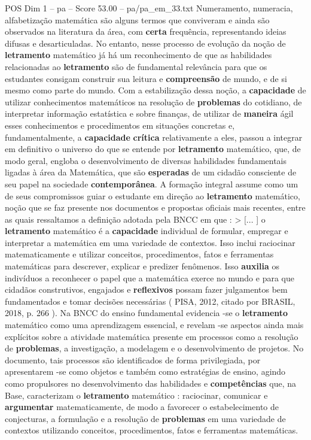 \begin{textsample}{POS Dim 1 – pa – Score 53.00 – pa/pa\_em\_33.txt}
Numeramento, numeracia, alfabetização matemática são alguns termos que conviveram e ainda são observados na literatura da área, com \textbf{certa} frequência, representando ideias difusas e desarticuladas.
No entanto, nesse processo de evolução da noção de \textbf{letramento} matemático já há um reconhecimento de que as habilidades relacionadas ao \textbf{letramento} são de fundamental relevância para que os estudantes consigam construir sua leitura e \textbf{compreensão} de mundo, e de si mesmo como parte do mundo.
Com a estabilização dessa noção, a \textbf{capacidade} de utilizar conhecimentos matemáticos na resolução de \textbf{problemas} do cotidiano, de interpretar informação estatística e sobre finanças, de utilizar de \textbf{maneira} ágil esses conhecimentos e procedimentos em situações concretas e, fundamentalmente, a \textbf{capacidade} \textbf{crítica} relativamente a eles, passou a integrar em definitivo o universo do que se entende por \textbf{letramento} matemático, que, de modo geral, engloba o desenvolvimento de diversas habilidades fundamentais ligadas à área da Matemática, que são \textbf{esperadas} de um cidadão consciente de seu papel na sociedade \textbf{contemporânea}.
A formação integral assume como um de seus compromissos guiar o estudante em direção ao \textbf{letramento} matemático, noção que se faz presente nos documentos e propostas oficiais mais recentes, entre as quais ressaltamos a definição adotada pela BNCC em que : > [... ] o \textbf{letramento} matemático é a \textbf{capacidade} individual de formular, empregar e interpretar a matemática em uma variedade de contextos.
Isso inclui raciocinar matematicamente e utilizar conceitos, procedimentos, fatos e ferramentas matemáticas para descrever, explicar e predizer fenômenos.
Isso \textbf{auxilia} os indivíduos a reconhecer o papel que a matemática exerce no mundo e para que cidadãos construtivos, engajados e \textbf{reflexivos} possam fazer julgamentos bem fundamentados e tomar decisões necessárias ( PISA, 2012, citado por BRASIL, 2018, p. 266 ).
Na BNCC do ensino fundamental evidencia -se o \textbf{letramento} matemático como uma aprendizagem essencial, e revelam -se aspectos ainda mais explícitos sobre a atividade matemática presente em processos como a resolução de \textbf{problemas}, a investigação, a modelagem e o desenvolvimento de projetos.
No documento, tais processos são identificados de forma privilegiada, por apresentarem -se como objetos e também como estratégias de ensino, agindo como propulsores no desenvolvimento das habilidades e \textbf{competências} que, na Base, caracterizam o \textbf{letramento} matemático : raciocinar, comunicar e \textbf{argumentar} matematicamente, de modo a favorecer o estabelecimento de conjecturas, a formulação e a resolução de \textbf{problemas} em uma variedade de contextos utilizando conceitos, procedimentos, fatos e ferramentas matemáticas.

\end{textsample}
